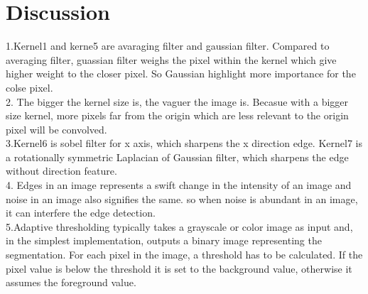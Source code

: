 \documentclass[14pt]{article}
\begin{document}
\section{Discussion}
1.Kernel1 and kerne5 are avaraging filter and gaussian filter. Compared to averaging filter, guassian filter weighs the pixel within the kernel which give higher weight to the closer pixel. So Gaussian highlight more importance for the colse pixel.\\
2. The bigger the kernel size is, the vaguer the image is. Becasue with a bigger size kernel, more pixels far from the origin which are less relevant to the origin pixel will be convolved.\\
3.Kernel6 is sobel filter for x axis, which sharpens the x direction edge. Kernel7 is a rotationally symmetric Laplacian of Gaussian filter, which sharpens the edge without direction feature.\\
4. Edges in an image represents a swift change in the intensity of an image and noise in an image also signifies the same. so when noise is abundant in an image, it can interfere the edge detection.\\
5.Adaptive thresholding typically takes a grayscale or color image as input and, in the simplest implementation, outputs a binary image representing the segmentation. For each pixel in the image, a threshold has to be calculated. If the pixel value is below the threshold it is set to the background value, otherwise it assumes the foreground value.
\end{document}
